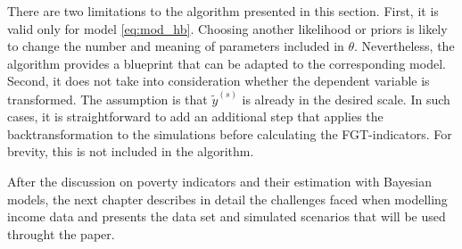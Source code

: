 There are two limitations to the algorithm presented in this section.
First, it is valid only for model \ref{eq:mod_hb}.
Choosing another likelihood or priors is likely to change the number and meaning of parameters included in $\theta$.
Nevertheless, the algorithm provides a blueprint that can be adapted to the corresponding model.
Second, it does not take into consideration whether the dependent variable is transformed.
The assumption is that $\tilde y^{(s)}$ is already in the desired scale.
In such cases, it is straightforward to add an additional step that applies the backtransformation to the simulations before calculating the FGT-indicators.
For brevity, this is not included in the algorithm.

After the discussion on poverty indicators and their estimation with Bayesian models, the next chapter describes in detail the challenges faced when modelling income data and presents the data set and simulated scenarios that will be used throught the paper.